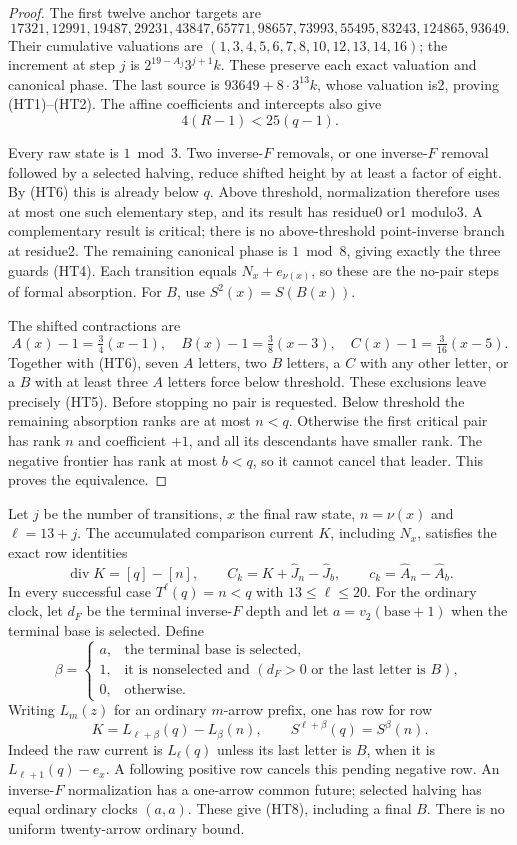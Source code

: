\documentclass[11pt]{article}
\begin{document}
\begin{proof}
The first twelve anchor targets are
\[
 17321,12991,19487,29231,43847,65771,
 98657,73993,55495,83243,124865,93649.
\]
Their cumulative valuations are
$(1,3,4,5,6,7,8,10,12,13,14,16)$; the increment at step $j$ is
$2^{19-A_j}3^{j+1}k$. These preserve each exact valuation and
canonical phase. The last source is $93649+8\cdot3^{13}k$,
whose valuation is2, proving (HT1)--(HT2). The affine coefficients
and intercepts also give
\[
 4(R-1)<25(q-1).
 \tag{HT6}
\]

Every raw state is $1\bmod3$. Two inverse-$F$ removals, or one
inverse-$F$ removal followed by a selected halving, reduce shifted
height by at least a factor of eight. By (HT6) this is already
below $q$. Above threshold, normalization therefore uses at most
one such elementary step, and its result has residue0 or1 modulo3.
A complementary result is critical; there is no above-threshold
point-inverse branch at residue2. The remaining canonical phase
is $1\bmod8$, giving exactly the three guards (HT4).
Each transition equals $N_x+e_{\nu(x)}$, so these are the
no-pair steps of formal absorption. For $B$, use
$S^2(x)=S(B(x))$.

The shifted contractions are
\[
 A(x)-1=\tfrac34(x-1),\quad
 B(x)-1=\tfrac38(x-3),\quad
 C(x)-1=\tfrac3{16}(x-5).
\]
Together with (HT6), seven $A$ letters, two $B$ letters, a $C$
with any other letter, or a $B$ with at least three $A$ letters
force below threshold. These exclusions leave precisely (HT5).
Before stopping no pair is requested. Below threshold the remaining
absorption ranks are at most $n<q$. Otherwise the first critical
pair has rank $n$ and coefficient $+1$, and all its descendants
have smaller rank. The negative frontier has rank at most $b<q$,
so it cannot cancel that leader. This proves the equivalence.
\end{proof}

Let $j$ be the number of transitions, $x$ the final raw state,
$n=\nu(x)$ and $\ell=13+j$. The accumulated comparison current $K$,
including $N_x$, satisfies the exact row identities
\[
 \operatorname{div}K=[q]-[n],\qquad
 C_k=K+\widehat J_n-\widehat J_b,\qquad
 c_k=\widehat A_n-\widehat A_b.
 \tag{HT7}
\]
In every successful case $T^\ell(q)=n<q$ with $13\le\ell\le20$.
For the ordinary clock, let $d_F$ be the terminal inverse-$F$
depth and let $a=v_2(\text{base}+1)$ when the terminal base is
selected. Define
\[
 \beta=
 \begin{cases}
 a,&\text{the terminal base is selected},\\
 1,&\text{it is nonselected and }(d_F>0\text{ or the last letter is }B),\\
 0,&\text{otherwise}.
 \end{cases}
\]
Writing $L_m(z)$ for an ordinary $m$-arrow prefix, one has row for row
\[
 K=L_{\ell+\beta}(q)-L_\beta(n),\qquad
 S^{\ell+\beta}(q)=S^\beta(n).
 \tag{HT8}
\]
Indeed the raw current is $L_\ell(q)$ unless its last letter is $B$,
when it is $L_{\ell+1}(q)-e_x$. A following positive row cancels
this pending negative row. An inverse-$F$ normalization has a
one-arrow common future; selected halving has equal ordinary
clocks $(a,a)$. These give (HT8), including a final $B$.
There is no uniform twenty-arrow ordinary bound.
\end{document}
